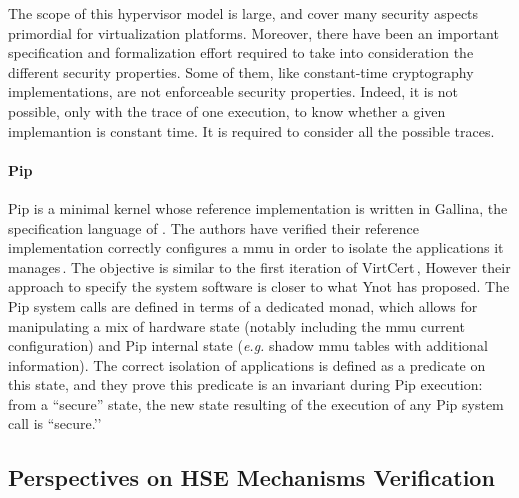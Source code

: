 The scope of this hypervisor model is large, and cover many security aspects
primordial for virtualization platforms.
%
Moreover, there have been an important specification and formalization effort
required to take into consideration the different security properties.
%
Some of them, like constant-time cryptography implementations, are not
enforceable security properties.
%
Indeed, it is not possible, only with the trace of one execution, to know
whether a given implemantion is constant time.
%
It is required to consider all the possible traces.

\paragraph{Pip}
%
Pip is a minimal kernel whose reference implementation is written in {\sc
  Gallina}, the specification language of .
%
The authors have verified their reference implementation correctly configures a
\ac{mmu} in order to isolate the applications it manages\,\cite{jomaa2016mmu}.
%
The objective is similar to the first iteration of
VirtCert\,\cite{barthe2011virtcert1}, However their approach to specify the
system software is closer to what Ynot has proposed.
%
The Pip system calls are defined in terms of a dedicated monad, which allows for
manipulating a mix of hardware state (notably including the \ac{mmu} current
configuration) and Pip internal state (\emph{e.g.} shadow \ac{mmu} tables with
additional information).
%
The correct isolation of applications is defined as a predicate on this state,
and they prove this predicate is an invariant during Pip execution:
%
from a ``secure'' state, the new state resulting of the execution of any Pip
system call is ``secure.’’

\subsection{Perspectives on HSE Mechanisms Verification}


